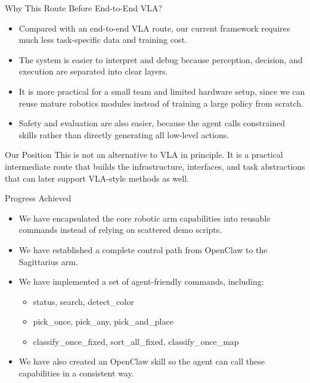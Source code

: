 \documentclass[aspectratio=169]{beamer}
\begin{document}
\begin{frame}{Why This Route Before End-to-End VLA?}
  \begin{itemize}
    \item Compared with an end-to-end VLA route, our current framework requires much less task-specific data and training cost.
    \item The system is easier to interpret and debug because perception, decision, and execution are separated into clear layers.
    \item It is more practical for a small team and limited hardware setup, since we can reuse mature robotics modules instead of training a large policy from scratch.
    \item Safety and evaluation are also easier, because the agent calls constrained skills rather than directly generating all low-level actions.
  \end{itemize}

  \vspace{0.5em}

  \begin{block}{Our Position}
    This is not an alternative to VLA in principle. It is a practical intermediate route that builds the infrastructure, interfaces, and task abstractions that can later support VLA-style methods as well.
  \end{block}
\end{frame}

\begin{frame}{Progress Achieved}
  \begin{itemize}
    \item We have encapsulated the core robotic arm capabilities into reusable commands instead of relying on scattered demo scripts.
    \item We have established a complete control path from OpenClaw to the Sagittarius arm.
    \item We have implemented a set of agent-friendly commands, including:
    \begin{itemize}
      \item status, search, detect\_color
      \item pick\_once, pick\_any, pick\_and\_place
      \item classify\_once\_fixed, sort\_all\_fixed, classify\_once\_map
    \end{itemize}
    \item We have also created an OpenClaw skill so the agent can call these capabilities in a consistent way.
  \end{itemize}
\end{frame}
\end{document}
